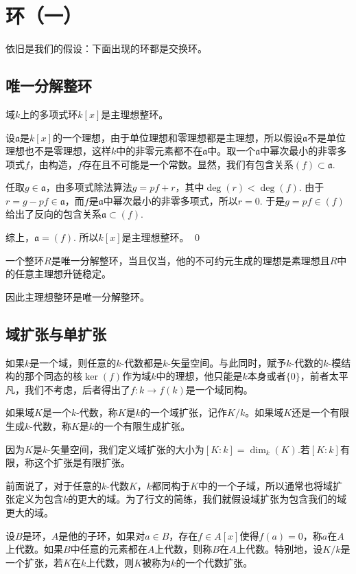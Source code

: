 \renewcommand\chapterimg{../Pictures/12.png}
\chapter{环（一）}
依旧是我们的假设：下面出现的环都是交换环。

\section{唯一分解整环}

\para 域$k$上的多项式环$k[x]$是主理想整环。

\proof
	设$\mathfrak{a}$是$k[x]$的一个理想，由于单位理想和零理想都是主理想，所以假设$\mathfrak{a}$不是单位理想也不是零理想，这样$k$中的非零元素都不在$\mathfrak{a}$中。取一个$\mathfrak{a}$中幂次最小的非零多项式$f$，由构造，$f$存在且不可能是一个常数。显然，我们有包含关系$(f)\subset \mathfrak{a}$.

	任取$g\in \mathfrak{a}$，由多项式除法算法$g=pf+r$，其中$\deg(r)<\deg(f)$. 由于$r=g-pf\in \mathfrak{a}$，而$f$是$\mathfrak{a}$中幂次最小的非零多项式，所以$r=0$. 于是$g=pf\in (f)$给出了反向的包含关系$\mathfrak{a}\subset (f)$.

	综上，$\mathfrak{a}=(f)$. 所以$k[x]$是主理想整环。
\qed

\pro 一个整环$R$是唯一分解整环，当且仅当，他的不可约元生成的理想是素理想且$R$中的任意主理想升链稳定。

\para 因此主理想整环是唯一分解整环。

\section{域扩张与单扩张}

如果$k$是一个域，则任意的$k$-代数都是$k$-矢量空间。与此同时，赋予$k$-代数的$k$-模结构的那个同态的核$\ker(f)$作为域$k$中的理想，他只能是$k$本身或者$\{0\}$，前者太平凡，我们不考虑，后者得出了$f:k\to f(k)$是一个域同构。

\para 如果域$K$是一个$k$-代数，称$K$是$k$的一个域扩张，记作$K/k$。如果域$K$还是一个有限生成$k$-代数，称$K$是$k$的一个有限生成扩张。

因为$K$是$k$-矢量空间，我们定义域扩张的大小为$[K:k]=\dim_k(K)$.若$[K:k]$有限，称这个扩张是有限扩张。

前面说了，对于任意的$k$-代数$K$，$k$都同构于$K$中的一个子域，所以通常也将域扩张定义为包含$k$的更大的域。为了行文的简练，我们就假设域扩张为包含我们的域更大的域。

\para 设$B$是环，$A$是他的子环，如果对$a\in B$，存在$f\in A[x]$使得$f(a)=0$，称$a$在$A$上代数。如果$B$中任意的元素都在$A$上代数，则称$B$在$A$上代数。特别地，设$K/k$是一个扩张，若$K$在$k$上代数，则$K$被称为$k$的一个代数扩张。

